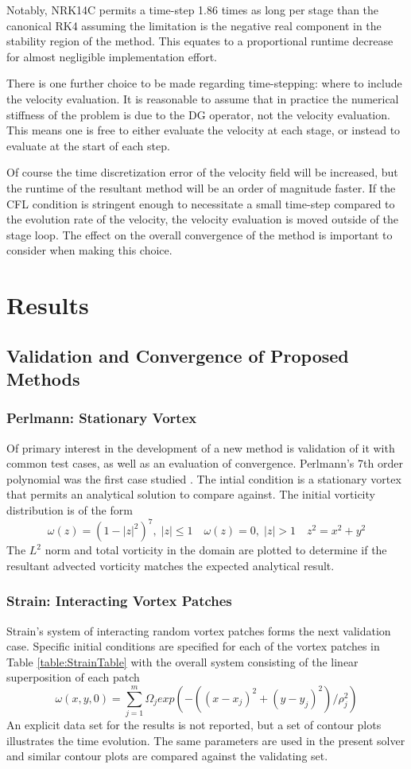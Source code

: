 \documentclass[letterpaper,12pt]{report}
\newcommand{\be}{\begin{equation}}
\newcommand{\ee}{\end{equation}}
\begin{document}
Notably, NRK14C permits a time-step 1.86 times as long per stage than the canonical RK4 assuming the limitation is the negative real component in the stability region of the method. This equates to a proportional runtime decrease for almost negligible implementation effort. 

There is one further choice to be made regarding time-stepping: where to include the velocity evaluation. It is reasonable to assume that in practice the numerical stiffness of the problem is due to the DG operator, not the velocity evaluation. This means one is free to either evaluate the velocity at each stage, or instead to evaluate at the start of each step. 

Of course the time discretization error of the velocity field will be increased, but the runtime of the resultant method will be an order of magnitude faster. If the CFL condition is stringent enough to necessitate a small time-step compared to the evolution rate of the velocity, the velocity evaluation is moved outside of the stage loop. The effect on the overall convergence of the method is important to consider when making this choice.


\chapter{Results}
\section{Validation and Convergence of Proposed Methods}
\subsection{Perlmann: Stationary Vortex}
Of primary interest in the development of a new method is validation of it with common test cases, as well as an evaluation of convergence. Perlmann's 7th order polynomial was the first case studied \cite{Perlmann1985}. The intial condition is a stationary vortex that permits an analytical solution to compare against. The initial vorticity distribution is of the form
\be \omega(z)=(1-|z|^2)^7, \; |z|\leq 1  \quad \omega(z)=0, \;|z|>1 \quad z^2=x^2+y^2 \ee
The $L^2$ norm and total vorticity in the domain are plotted to determine if the resultant advected vorticity matches the expected analytical result.

\subsection{Strain: Interacting Vortex Patches}
Strain's system of interacting random vortex patches \cite{Strain1996} forms the next validation case. Specific initial conditions are specified for each of the vortex patches in Table \ref{table:StrainTable} with the overall system consisting of the linear superposition of each patch
\be \omega(x,y,0) = \sum_{j=1}^m \Omega_j exp(-((x-x_j)^2 + (y-y_j)^2)/\rho_j^2) \ee
An explicit data set for the results is not reported, but a set of contour plots illustrates the time evolution. The same parameters are used in the present solver and similar contour plots are compared against the validating set.
\end{document}
